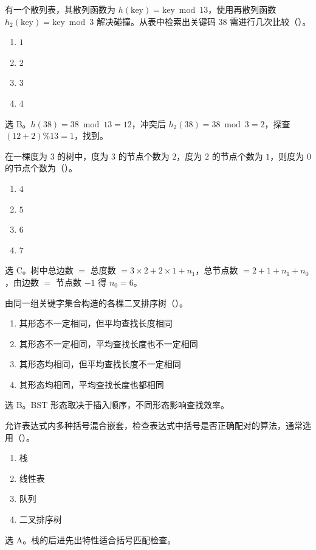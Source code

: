 \begin{question}
有一个散列表，其散列函数为 $h(\text{key})=\text{key}\bmod 13$，使用再散列函数 $h_2(\text{key})=\text{key}\bmod 3$ 解决碰撞。从表中检索出关键码 $38$ 需进行几次比较（\quad）。
\begin{enumerate}
  \item $1$
  \item $2$
  \item $3$
  \item $4$
\end{enumerate}
\begin{solution}
选 B。$h(38)=38\bmod13=12$，冲突后 $h_2(38)=38\bmod3=2$，探查 $(12+2)\%13=1$，找到。
\end{solution}
\end{question}

\begin{question}
在一棵度为 $3$ 的树中，度为 $3$ 的节点个数为 $2$，度为 $2$ 的节点个数为 $1$，则度为 $0$ 的节点个数为（\quad）。
\begin{enumerate}
  \item $4$
  \item $5$
  \item $6$
  \item $7$
\end{enumerate}
\begin{solution}
选 C。树中总边数 $=$ 总度数 $=3\times2+2\times1+n_1$，总节点数 $=2+1+n_1+n_0$，由边数 $=$ 节点数 $-1$ 得 $n_0=6$。
\end{solution}
\end{question}

\begin{question}
由同一组关键字集合构造的各棵二叉排序树（\quad）。
\begin{enumerate}
  \item 其形态不一定相同，但平均查找长度相同
  \item 其形态不一定相同，平均查找长度也不一定相同
  \item 其形态均相同，但平均查找长度不一定相同
  \item 其形态均相同，平均查找长度也都相同
\end{enumerate}
\begin{solution}
选 B。BST 形态取决于插入顺序，不同形态影响查找效率。
\end{solution}
\end{question}

\begin{question}
允许表达式内多种括号混合嵌套，检查表达式中括号是否正确配对的算法，通常选用（\quad）。
\begin{enumerate}
  \item 栈
  \item 线性表
  \item 队列
  \item 二叉排序树
\end{enumerate}
\begin{solution}
选 A。栈的后进先出特性适合括号匹配检查。
\end{solution}
\end{question}

